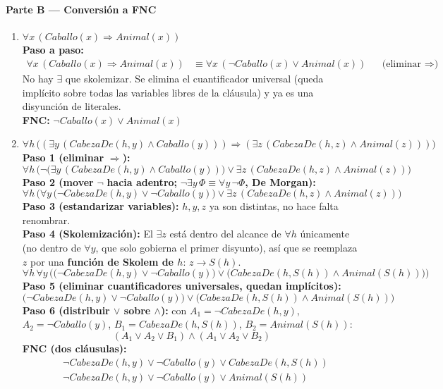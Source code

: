 \paragraph{Parte B --- Conversión a FNC}

\begin{enumerate}
    \item[5.] $\forall x\,(Caballo(x) \Rightarrow Animal(x))$\\
    \textbf{Paso a paso:}
    \begin{align*}
        \forall x\,(Caballo(x)\Rightarrow Animal(x)) &\equiv \forall x\,(\neg Caballo(x)\lor
        Animal(x)) &&\text{(eliminar }\Rightarrow\text{)}
    \end{align*}
    No hay $\exists$ que skolemizar. Se elimina el cuantificador universal (queda implícito sobre
    todas las variables libres de la cláusula) y ya es una disyunción de literales.\\
    \textbf{FNC:} $\neg Caballo(x) \lor Animal(x)$

    \item[6.] $\forall h\, \big((\exists y\,(CabezaDe(h,y)\land Caballo(y))) \Rightarrow (\exists
    z\,(CabezaDe(h,z)\land Animal(z)))\big)$\\
    \textbf{Paso 1 (eliminar} $\Rightarrow$\textbf{):}
    \[
        \forall h\, \Big(\neg\big(\exists y\,(CabezaDe(h,y)\land Caballo(y))\big) \lor
        \exists z\,(CabezaDe(h,z)\land Animal(z))\Big)
    \]
    \textbf{Paso 2 (mover} $\neg$ \textbf{hacia adentro; } $\neg\exists y\,\Phi \equiv \forall
    y\,\neg\Phi$\textbf{, De Morgan):}
    \[
        \forall h\, \Big(\forall y\, \big(\neg CabezaDe(h,y)\lor\neg Caballo(y)\big) \lor
        \exists z\,(CabezaDe(h,z)\land Animal(z))\Big)
    \]
    \textbf{Paso 3 (estandarizar variables):} $h,y,z$ ya son distintas, no hace falta renombrar.\\
    \textbf{Paso 4 (Skolemización):} El $\exists z$ está dentro del alcance de $\forall h$
    únicamente (no dentro de $\forall y$, que solo gobierna el primer disyunto), así que se reemplaza
    $z$ por una \textbf{función de Skolem de $h$}: $z \to S(h)$.
    \[
        \forall h\,\forall y\, \Big(\big(\neg CabezaDe(h,y)\lor\neg Caballo(y)\big) \lor
        \big(CabezaDe(h,S(h))\land Animal(S(h))\big)\Big)
    \]
    \textbf{Paso 5 (eliminar cuantificadores universales, quedan implícitos):}
    \[
        \big(\neg CabezaDe(h,y)\lor\neg Caballo(y)\big) \lor \big(CabezaDe(h,S(h))\land Animal(S(h))\big)
    \]
    \textbf{Paso 6 (distribuir $\lor$ sobre $\land$):} con $A_1=\neg CabezaDe(h,y)$,
    $A_2=\neg Caballo(y)$, $B_1=CabezaDe(h,S(h))$, $B_2=Animal(S(h))$:
    \[
        (A_1\lor A_2\lor B_1) \land (A_1\lor A_2\lor B_2)
    \]
    \textbf{FNC (dos cláusulas):}
    \begin{align*}
        &\neg CabezaDe(h,y) \lor \neg Caballo(y) \lor CabezaDe(h,S(h)) \tag{C-A}\\
        &\neg CabezaDe(h,y) \lor \neg Caballo(y) \lor Animal(S(h)) \tag{C-B}
    \end{align*}
\end{enumerate}

